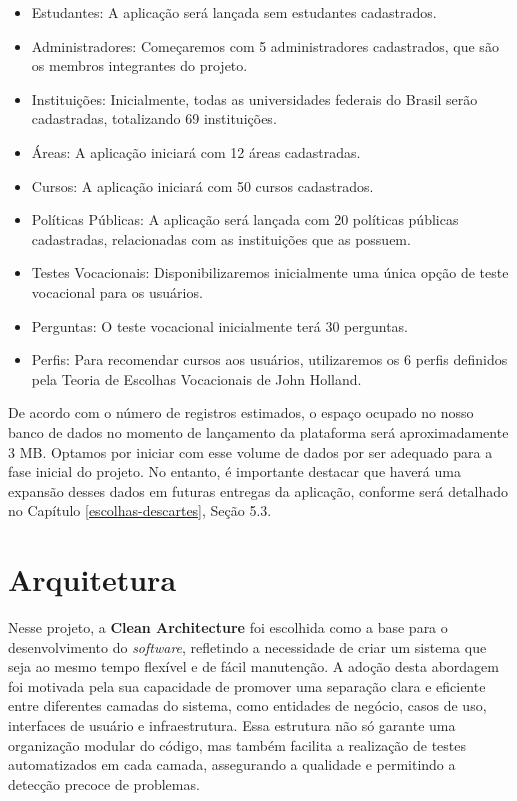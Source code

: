 \begin{itemize}
\item Estudantes: A aplicação será lançada sem estudantes cadastrados.
\item Administradores: Começaremos com 5 administradores cadastrados, que são os membros integrantes do projeto.
\item Instituições: Inicialmente, todas as universidades federais do Brasil serão cadastradas, totalizando 69 instituições.
\item Áreas: A aplicação iniciará com 12 áreas cadastradas. 
\item Cursos: A aplicação iniciará com 50 cursos cadastrados. 
\item Políticas Públicas: A aplicação será lançada com 20 políticas públicas cadastradas, relacionadas com as instituições que as possuem.
\item Testes Vocacionais: Disponibilizaremos inicialmente uma única opção de teste vocacional para os usuários.
\item Perguntas: O teste vocacional inicialmente terá 30 perguntas.
\item Perfis: Para recomendar cursos aos usuários, utilizaremos os 6 perfis definidos pela Teoria de Escolhas Vocacionais de John Holland.
\end{itemize}

De acordo com o número de registros estimados, o espaço ocupado no nosso banco de dados no momento de lançamento da plataforma será aproximadamente 3 MB.  Optamos por iniciar com esse volume de dados por ser adequado para a fase inicial do projeto. No entanto, é importante destacar que haverá uma expansão desses dados em futuras entregas da aplicação, conforme será detalhado no Capítulo \ref{escolhas-descartes}, Seção 5.3.


\section{Arquitetura}

Nesse projeto, a \textbf{Clean Architecture} foi escolhida como a base para o desenvolvimento do \textit{software}, refletindo a necessidade de criar um sistema que seja ao mesmo tempo flexível e de fácil manutenção. A adoção desta abordagem foi motivada pela sua capacidade de promover uma separação clara e eficiente entre diferentes camadas do sistema, como entidades de negócio, casos de uso, interfaces de usuário e infraestrutura. Essa estrutura não só garante uma organização modular do código, mas também facilita a realização de testes automatizados em cada camada, assegurando a qualidade e permitindo a detecção precoce de problemas.

